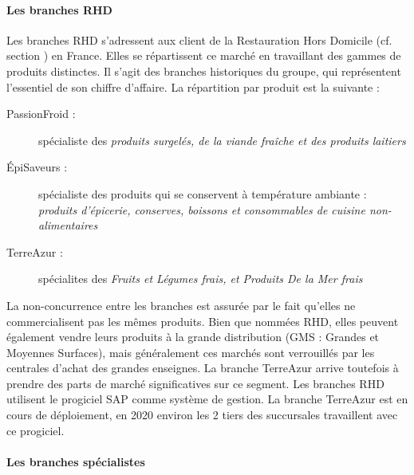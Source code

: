                 \paragraph{Les branches RHD}
                
                Les branches RHD s'adressent aux client de la Restauration Hors Domicile (cf. section ) en France.
                Elles se répartissent ce marché en travaillant des gammes de produits distinctes.
                Il s'agit des branches historiques du groupe, qui représentent l'essentiel de son chiffre d'affaire.
                La répartition par produit est la suivante :
                \begin{description}
                    \item[PassionFroid :] spécialiste des \emph{produits surgelés, de la viande fraîche et des produits laitiers}
                    \item[\'{E}piSaveurs :] spécialiste des produits qui se conservent à température ambiante : \emph{produits d'épicerie, conserves, boissons et consommables de cuisine non-alimentaires}
                    \item[TerreAzur :] spécialites des \emph{Fruits et Légumes frais, et Produits De la Mer frais} 
                \end{description}
                La non-concurrence entre les branches est assurée par le fait qu'elles ne commercialisent pas les mêmes produits.
                Bien que nommées RHD, elles peuvent également vendre leurs produits à la grande distribution (GMS : Grandes et Moyennes Surfaces), mais généralement ces marchés sont verrouillés par les centrales d'achat des grandes enseignes.
                La branche TerreAzur arrive toutefois à prendre des parts de marché significatives sur ce segment.
                Les branches RHD utilisent le progiciel SAP comme système de gestion.
                La branche TerreAzur est en cours de déploiement, en 2020 environ les 2 tiers des succursales travaillent avec ce progiciel.

                \paragraph{Les branches spécialistes}

